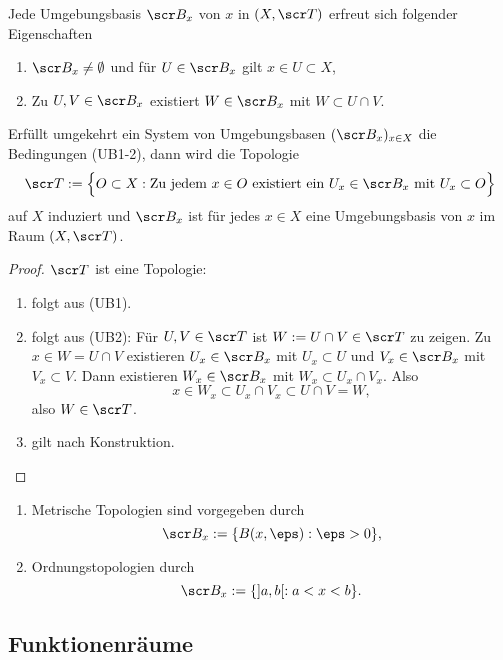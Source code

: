 
\begin{st} \label{st:local_bases}
	Jede Umgebungsbasis $\scr B_x$ von $x$ in $(X, \scr T)$ erfreut sich folgender Eigenschaften
	\begin{enumerate}[(UB1),leftmargin=*]
		\item
			$\scr B_x \neq \emptyset$ und für $U \in \scr B_x$ gilt $x \in U \subset X$,
		\item
			Zu $U,V \in \scr B_x$ existiert $W \in \scr B_x$ mit $W \subset U \cap V$.
	\end{enumerate}

	Erfüllt umgekehrt ein System von Umgebungsbasen $(\scr B_x)_{x\in X}$ die Bedingungen (UB1-2), dann wird die Topologie
	\[
		\scr T := \Big\{ O \subset X : \text{Zu jedem $x\in O$ existiert ein $U_x \in \scr B_x$ mit $U_x \subset O$} \Big\}
	\]
	auf $X$ induziert und
	$\scr B_x$ ist für jedes $x \in X$ eine Umgebungsbasis von $x$ im Raum $(X, \scr T)$.
	\begin{proof}
		$\scr T$ ist eine Topologie:
		\begin{enumerate}[(O1),leftmargin=*]
			\item
				folgt aus (UB1).
			\item
				folgt aus (UB2):
				Für $U, V \in \scr T$ ist $W := U \cap V \in \scr T$ zu zeigen.
				Zu $x \in W = U \cap V$ existieren $U_x \in \scr B_x$ mit $U_x \subset U$ und $V_x \in \scr B_x$ mit $V_x \subset V$.
				Dann existieren $W_x \in \scr B_x$ mit $W_x \subset U_x \cap V_x$.
				Also
				\[
					x \in W_x \subset U_x \cap V_x \subset U \cap V = W,
				\]
				also $W \in \scr T$.
			\item
				gilt nach Konstruktion.
		\end{enumerate}
	\end{proof}
\end{st}

\begin{ex}
	\begin{enumerate}[1.)]
		\item
			Metrische Topologien sind vorgegeben durch
			\[
				\scr B_x := \{ B(x,\eps) : \eps > 0 \},
			\]
		\item
			Ordnungstopologien durch
			\[
				\scr B_x := \{ ]a,b[ : a < x < b \}.
			\]
	\end{enumerate}
\end{ex}

\subsection{Funktionenräume}

